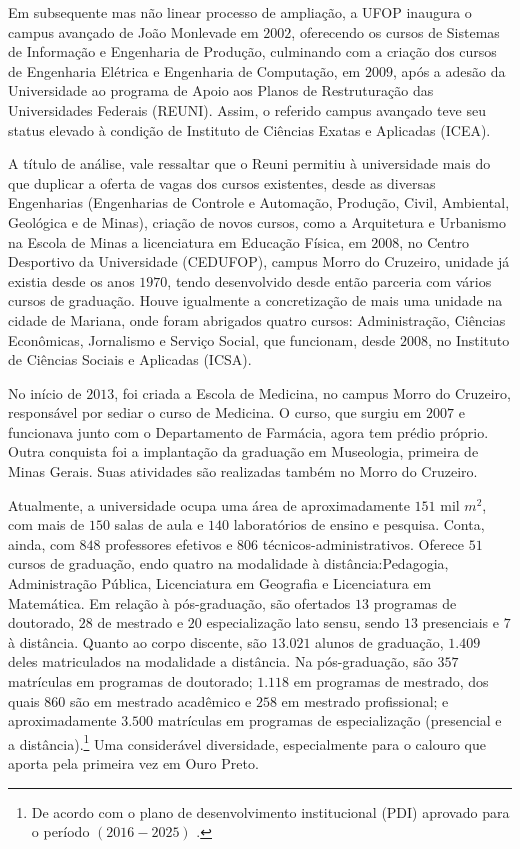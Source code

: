 Em subsequente mas não linear processo de ampliação, a UFOP inaugura o campus avançado de João Monlevade em $2002$, oferecendo os cursos de Sistemas de Informação e Engenharia de Produção, culminando com a criação dos cursos de Engenharia Elétrica e Engenharia de Computação, em $2009$, após a adesão da Universidade ao programa de Apoio aos Planos de Restruturação das Universidades Federais (REUNI). Assim, o referido campus avançado teve seu status elevado à condição de Instituto de Ciências Exatas e Aplicadas (ICEA). 

A título de análise, vale ressaltar que o Reuni permitiu à universidade mais do que duplicar a oferta de vagas dos cursos existentes, desde as diversas Engenharias (Engenharias de Controle e Automação, Produção, Civil, Ambiental, Geológica e de Minas), criação de novos cursos, como a Arquitetura e Urbanismo na Escola de Minas a licenciatura em Educação Física, em $2008$, no Centro Desportivo da Universidade (CEDUFOP), campus Morro do Cruzeiro, unidade já existia desde os anos $1970$, tendo desenvolvido desde então parceria com vários cursos de graduação. Houve igualmente a concretização de mais uma unidade na cidade de Mariana, onde foram abrigados quatro cursos: Administração, Ciências Econômicas, Jornalismo e Serviço Social, que funcionam, desde $2008$, no Instituto de Ciências Sociais e Aplicadas (ICSA). 

No início de $2013$, foi criada a Escola de Medicina, no campus Morro do Cruzeiro, responsável por sediar o curso de Medicina. O curso, que surgiu em $2007$ e funcionava junto com o Departamento de Farmácia, agora tem prédio próprio. Outra conquista foi a implantação da graduação em Museologia, primeira de Minas Gerais. Suas atividades são realizadas também no Morro do Cruzeiro.

Atualmente, a universidade ocupa uma área de aproximadamente $151$ mil $m^2$, com mais de $150$ salas de aula e $140$ laboratórios de ensino e pesquisa. Conta, ainda, com $848$ professores efetivos e $806$ técnicos-administrativos. Oferece $51$ cursos de graduação, endo quatro na modalidade à distância:Pedagogia, Administração Pública, Licenciatura em Geografia e Licenciatura em Matemática. Em relação à pós-graduação, são ofertados $13$ programas de doutorado, $28$ de mestrado e $20$ especialização lato sensu, sendo $13$ presenciais e $7$ à distância. Quanto ao corpo discente, são $13.021$ alunos de graduação, $1.409$ deles matriculados na modalidade a distância. Na pós-graduação, são $357$ matrículas em programas de doutorado; $1.118$ em programas de mestrado, dos quais $860$ são em mestrado acadêmico e $258$ em mestrado profissional; e aproximadamente $3.500$ matrículas em programas de especialização (presencial e a distância).\footnote{De acordo com o plano de desenvolvimento institucional (PDI) aprovado para o período $(2016-2025)$ \cite{resolucao-cuni-1}.} Uma considerável diversidade, especialmente para o calouro que aporta pela primeira vez em Ouro Preto.
%
